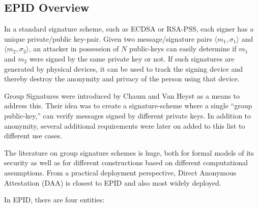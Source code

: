 \documentclass[letterpaper]{article}
\begin{document}
  \subsection{EPID Overview}
  \label{ssec:epid}
  In a standard signature scheme, such as ECDSA or RSA-PSS, each
  signer has a unique private/public key-pair. Given two
  message/signature pairs $\langle m_1, \sigma_1 \rangle$ and $\langle
  m_2, \sigma_2 \rangle$, an attacker in possession of $N$ public-keys
  can easily determine if $m_1$ and $m_2$ were signed by the same
  private key or not. If such signatures are generated by physical
  devices, it can be used to track the signing device and thereby
  destroy the anonymity and privacy of the person using that device.

  Group Signatures were introduced by Chaum and Van Heyst
  \cite{ChaumGroupSignatures} as a means to address this. Their idea
  was to create a signature-scheme where a single ``group
  public-key,'' can verify messages signed by different private
  keys. In addition to anonymity, several additional requirements were
  later on added to this list to different use cases.

  The literature on group signature schemes is huge, both for formal
  models of its security
  \cite{BMW03,dynamicGroupSignatures,fulldynamicgroupsignature} as
  well as for different constructions \cite{bbs, Furukawa2005,
    coalitionresistant, camenischLysyankaya} based on different
  computational assumptions. From a practical deployment perspective,
  Direct Anonymous Attestation \cite{daa, ucdaa} (DAA) is closest to
  EPID and also most widely deployed.


  In EPID, there are four entities:
\end{document}
